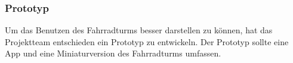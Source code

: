 \subsubsection{Prototyp}

Um das Benutzen des Fahrradturms besser darstellen zu können, hat das Projektteam entschieden ein Prototyp zu entwickeln. Der Prototyp sollte eine App und eine Miniaturversion des Fahrradturms umfassen.